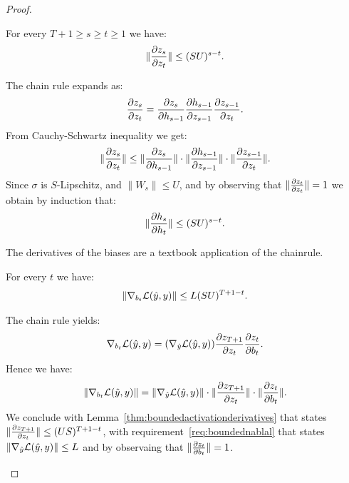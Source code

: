 \begin{proof}
    
    \begin{lemma}\label{thm:boundedactivationderivatives}
        For every $T+1\geq s\geq t\geq 1$ we have:
        \begin{equation}
            \|\frac{\partial z_s}{\partial z_t}\|\leq (SU)^{s-t}.
        \end{equation}
    \end{lemma}
    \begin{subproof}
        The chain rule expands as:
            \begin{equation}
                \frac{\partial z_s}{\partial z_t}=\frac{\partial z_s}{\partial h_{s-1}}\frac{\partial h_{s-1}}{\partial z_{s-1}}\frac{\partial z_{s-1}}{\partial z_t}.
            \end{equation}
        From Cauchy-Schwartz inequality we get:
            \begin{equation}
                \|\frac{\partial z_s}{\partial z_t}\|\leq\|\frac{\partial z_s}{\partial h_{s-1}}\|\cdot\|\frac{\partial h_{s-1}}{\partial z_{s-1}}\|\cdot\|\frac{\partial z_{s-1}}{\partial z_t}\|.
            \end{equation}
        Since $\sigma$ is $S$-Lipschitz, and $\|W_s\|\leq U$, and by observing that $\|\frac{\partial z_t}{\partial z_t}\|=1$ we obtain by induction that:
            \begin{equation}
                \|\frac{\partial h_s}{\partial h_t}\|\leq (SU)^{s-t}.
            \end{equation}
    \end{subproof}
    
    
    The derivatives of the biases are a textbook application of the chainrule.
    
    
    \begin{lemma}\label{thm:boundedbiasderivatives}
        For every $t$ we have:
        \begin{equation}
            \|\nabla_{b_t}\mathcal{L}(\hat y,y)\|\leq L(SU)^{T+1-t}.
        \end{equation}
    \end{lemma}
    \begin{subproof}
    The chain rule yields:
        \begin{equation}
            \nabla_{b_t}\mathcal{L}(\hat y,y)=(\nabla_{\hat y}\mathcal{L}(\hat y,y))\frac{\partial z_{T+1}}{\partial z_t}\frac{\partial z_t}{\partial b_t}.
        \end{equation}
    Hence we have:
        \begin{equation}
            \|\nabla_{b_t}\mathcal{L}(\hat y,y)\|=\|\nabla_{\hat y}\mathcal{L}(\hat y,y)\|\cdot\|\frac{\partial z_{T+1}}{\partial z_t}\|\cdot\|\frac{\partial z_t}{\partial b_t}\|.
        \end{equation}
    We conclude with Lemma~\ref{thm:boundedactivationderivatives} that states $\|\frac{\partial z_{T+1}}{\partial z_t}\|\leq (US)^{T+1-t}$, with requirement~\ref{req:boundednablal} that states $\|\nabla_{\hat y}\mathcal{L}(\hat y,y)\|\leq L$ and by observaing that $\|\frac{\partial z_t}{\partial b_t}\|=1$.  
    \end{subproof}
    

\end{proof}
